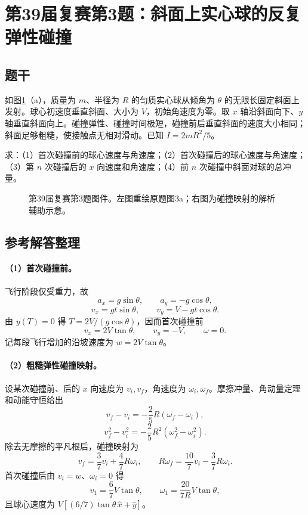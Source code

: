 \section{第39届复赛第3题：斜面上实心球的反复弹性碰撞}

\subsection{题干}
如图\ref{fig:cpho39q03}（a），质量为 $m$、半径为 $R$ 的匀质实心球从倾角为 $\theta$ 的无限长固定斜面上发射。球心初速度垂直斜面、大小为 $V$，初始角速度为零。取 $x$ 轴沿斜面向下、$y$ 轴垂直斜面向上。碰撞弹性、碰撞时间极短，碰撞前后垂直斜面的速度大小相同；斜面足够粗糙，使接触点无相对滑动。已知 $I=2mR^2/5$。

求：（1）首次碰撞前的球心速度与角速度；（2）首次碰撞后的球心速度与角速度；（3）第 $n$ 次碰撞后的 $x$ 向速度和角速度；（4）前 $n$ 次碰撞中斜面对球的总冲量。

\begin{figure}[htbp]
  \centering
  
  \caption{第39届复赛第3题图件。左图重绘原题图3a；右图为碰撞映射的解析辅助示意。}
  \label{fig:cpho39q03}
\end{figure}

\subsection{参考解答整理}
\paragraph{（1）首次碰撞前。}
飞行阶段仅受重力，故
\[
a_x=g\sin\theta,\qquad a_y=-g\cos\theta,
\]
\[
v_x=gt\sin\theta,\qquad v_y=V-gt\cos\theta.
\]
由 $y(T)=0$ 得 $T=2V/(g\cos\theta)$，因而首次碰撞前
\[
\boxed{v_x=2V\tan\theta,\qquad v_y=-V,\qquad \omega=0.}
\]
记每段飞行增加的沿坡速度为 $w=2V\tan\theta$。

\paragraph{（2）粗糙弹性碰撞映射。}
设某次碰撞前、后的 $x$ 向速度为 $v_i,v_f$，角速度为 $\omega_i,\omega_f$。摩擦冲量、角动量定理和动能守恒给出
\[
v_f-v_i=-\frac25R(\omega_f-\omega_i),
\]
\[
v_f^2-v_i^2=-\frac25R^2(\omega_f^2-\omega_i^2).
\]
除去无摩擦的平凡根后，碰撞映射为
\[
v_f=\frac37v_i+\frac47R\omega_i,\qquad
R\omega_f=\frac{10}{7}v_i-\frac37R\omega_i.
\]
首次碰撞后由 $v_i=w$、$\omega_i=0$ 得
\[
\boxed{v_1=\frac67V\tan\theta,\qquad \omega_1=\frac{20}{7R}V\tan\theta,}
\]
且球心速度为 $V[(6/7)\tan\theta\,\hat{x}+\hat{y}]$。


